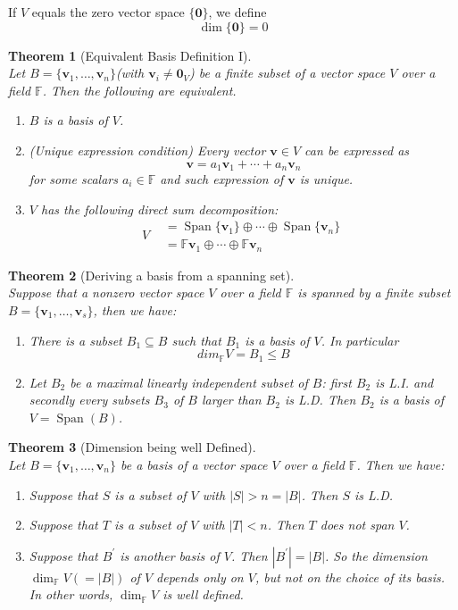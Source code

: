 \documentclass[12pt]{article}
\newtheorem{theorem}{Theorem}[section]
\theoremstyle{definition}
\DeclareMathOperator{\spn}{Span}
\begin{document}
If $V$ equals the zero vector space $\{\mathbf{0}\}$, we define
\[
\dim\{\mathbf{0}\}=0
\]
\begin{theorem}[Equivalent Basis Definition I]
\hfill\\\normalfont Let $B=\{\mathbf{v}_1,\ldots,\mathbf{v}_n\}$(with $\mathbf{v}_i\neq \mathbf{0}_V$) be a finite subset of a vector space $V$ over a field $\mathbb{F}$. Then the following are equivalent.
\begin{enumerate}[label=(\arabic*)]
\item $B$ is a basis of $V$.
\item (Unique expression condition) Every vector $\mathbf{v}\in V$ can be expressed as
\[
\mathbf{v}=a_1\mathbf{v}_1+\cdots+a_n\mathbf{v}_n
\]
for some scalars $a_i\in\mathbb{F}$ and such expression of $\mathbf{v}$ is unique.
\item $V$ has the following direct sum decomposition:
\[V\begin{aligned}
&=\spn\{\mathbf{v}_1\}\oplus\cdots\oplus\spn\{\mathbf{v}_n\}\\
&=\mathbb{F}\mathbf{v}_1\oplus\cdots\oplus\mathbb{F}\mathbf{v}_n
\end{aligned}
\]
\end{enumerate}
\end{theorem}
\begin{theorem}[Deriving a basis from a spanning set]
\hfill\\\normalfont Suppose that a nonzero vector space $V$ over a field $\mathbb{F}$ is spanned by a finite subset $B=\{\mathbf{v}_1,\ldots,\mathbf{v}_s\}$, then we have:
\begin{enumerate}[label=(\arabic*)]
\item There is a subset $B_1\subseteq B$ such that $B_1$ is a basis of $V$. In particular
\[
dim_\mathbb{F}V=B_1\leq B
\]
\item Let $B_2$ be a maximal linearly independent subset of $B$: first $B_2$ is L.I. and secondly every subsets $B_3$ of $B$ larger than $B_2$ is L.D. Then $B_2$ is a basis of $V=\spn(B)$.
\end{enumerate}
\end{theorem}
\begin{theorem}[Dimension being well Defined]
\hfill\\\normalfont Let $B = \{\mathbf{v}_1,\ldots,\mathbf{v}_n\}$ be a basis of a vector space $V$ over a field $\mathbb{F}$. Then we have:
\begin{enumerate}[label=(\arabic*)]
\item Suppose that $S$ is a subset of $V$ with $|S|>n=|B|$. Then $S$ is L.D.
\item Suppose that $T$ is a subset of $V$ with $|T|<n$. Then $T$ does not span $V$.
\item Suppose that $B^\prime$ is another basis of $V$. Then $|B^\prime|=|B|$. So the dimension $\dim_\mathbb{F}V(=|B|)$ of $V$ depends only on $V$, but not on the choice of its basis. \\In other words, $\dim_\mathbb{F}V$ is well defined.
\end{enumerate}
\end{theorem}
\end{document}
